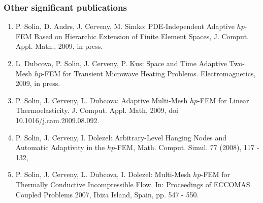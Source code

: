 \documentclass[11pt,letterpaper]{article}
\begin{document}
\subsubsection*{Other significant publications}
\begin{enumerate}
\item P. Solin, D. Andrs, J. Cerveny, M. Simko: PDE-Independent Adaptive $hp$-FEM 
      Based on Hierarchic Extension of Finite Element Spaces, J. Comput. Appl. Math., 2009, in press.
\vspace{-3mm}
\item L. Dubcova, P. Solin, J. Cerveny, P. Kus: Space and Time Adaptive Two-Mesh $hp$-FEM 
      for Transient Microwave Heating Problems. Electromagnetics, 2009, in press.
\vspace{-3mm}
\item P. Solin, J. Cerveny, L. Dubcova: Adaptive Multi-Mesh $hp$-FEM for Linear Thermoelasticity.
      J. Comput. Appl. Math, 2009, doi 10.1016/j.cam.2009.08.092.
\vspace{-3mm}
\item P. Solin, J. Cerveny, I. Dolezel: Arbitrary-Level Hanging Nodes and 
      Automatic Adaptivity in the $hp$-FEM, Math. Comput. Simul. 77 (2008), 117 - 132, 
\vspace{-3mm}
\item P. Solin, J. Cerveny, L. Dubcova, I. Dolezel: Multi-Mesh $hp$-FEM for Thermally 
      Conductive Incompressible Flow. In: Proceedings of ECCOMAS Coupled Problems 2007, 
      Ibiza Island, Spain, pp. 547 - 550.
\end{enumerate}
\end{document}
